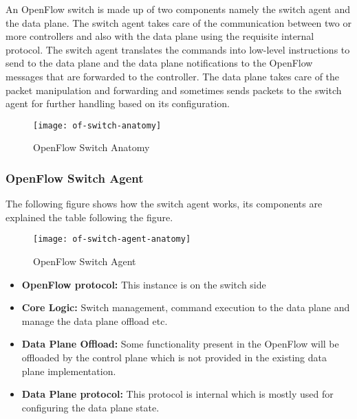  An OpenFlow switch is made up of two components namely the switch agent and the data plane. The switch agent takes care of the communication between two or more controllers and also with the data plane using the requisite internal protocol. The switch agent translates the commands into low-level instructions to send to the data plane and the data plane notifications to the OpenFlow messages that are forwarded to the controller. The data plane takes care of the packet manipulation and forwarding and sometimes sends packets to the switch agent for further handling based on its configuration.
 
\begin{figure}[H]
 	\centering
 	\texttt{[image: of-switch-anatomy]}
 	\caption{OpenFlow Switch Anatomy \cite{Of_Switch_img}} \label{fig:Of_switch_anatomy}
 	\vspace{-10pt}
\end{figure}
 
\subsubsection{OpenFlow Switch Agent \cite{Opnflow_switch}} \label{Of_switch_agent}
 The following figure shows how the switch agent works, its components are explained the table following the figure.
 
\begin{figure}[H]
 	\centering
 	\texttt{[image: of-switch-agent-anatomy]}
 	\caption{OpenFlow Switch Agent \cite{Of_Switch_agent_img}} \label{fig:Of_switch_agent}
 	\vspace{-10pt}
\end{figure}

\begin{itemize}
	\item \textbf{OpenFlow protocol:} This instance is on the switch side
	\item \textbf{Core Logic:} Switch management, command execution to the data plane and manage the data plane offload etc.
	\item \textbf{Data Plane Offload:} Some functionality present in the OpenFlow will be offloaded by the control plane which is not provided in the existing data plane implementation.
	\item \textbf{Data Plane protocol:} This protocol is internal which is mostly used for configuring the data plane state.
	
\end{itemize}

